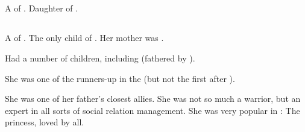 \section{\Vesrai}
\index{\Vesrai}
A \ketheran{} \resvil{} of \CiriathSepher. 
Daughter of . 















\section{\Zereth}
\index{\Zereth}
A \ketheran{} \resvil{} of \CiriathSepher. 
The only child of .
Her mother was . 

Had a number of children, including  (fathered by ). 

She was one of the runners-up in the  (but not the first after \Azraid). 

She was one of her father's closest allies. 
She was not so much a warrior, but an expert in all sorts of social relation management. 
She was very popular in \CiriathSepher{}: 
The princess, loved by all. 























\chapter{\Kezerad}


















